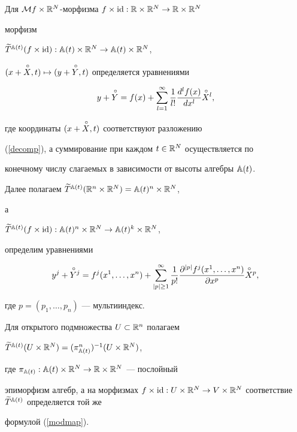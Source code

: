 Для ${\cal M} f\times{\Bbb R}^N$-морфизма $f\times\operatorname{id}:{\Bbb R}\times{\Bbb R}^N\rightarrow{\Bbb R}\times{\Bbb R}^N$


морфизм


$\widetilde T{}^{{\Bbb A}(t)}(f\times\operatorname{id}):{\Bbb A}(t)\times{\Bbb R}^N\rightarrow{\Bbb A}(t)\times{\Bbb R}^N$,


$(x+\overset{\,\circ}{X}{},t)\mapsto(y+\overset{\,\circ}{Y}{},t)$ определяется уравнениями


$$


y+\rad{Y}=f(x)+\sum^\infty_{l=1}\frac{1}{l!}


\frac{d^lf(x)}{dx^l}\rad{X}^l,


$$


где координаты $(x+\overset{\,\circ}{X}{},t)$ соответствуют разложению


(\ref{decomp}), а суммирование при каждом $t\in{\Bbb R}^N$ осуществляется по


конечному числу слагаемых в зависимости от высоты алгебры ${\Bbb A}(t)$.





Далее полагаем $\widetilde T{}^{{\Bbb A}(t)}({\Bbb R}^n\times{\Bbb R}^N)={\Bbb A}(t)^n\times{\Bbb R}^N$,


а


$\widetilde T{}^{{\Bbb A}(t)}(f\times\operatorname{id}):{\Bbb A}(t)^n\times{\Bbb R}^N\rightarrow{\Bbb A}(t)^k\times{\Bbb R}^N$,


определим уравнениями


\begin{equation}\label{modmap}


y^j+\rad{Y}^j=f^j(x^1,\dotsc,x^n)+


\sum^\infty_{|p|\geq 1}\frac{1}{p!}


\frac{\partial^{|p|}f^j(x^1,\dotsc,x^n)}{\partial x^p}\rad{X}^p,


\end{equation}


где $p=(p_1,\dotsc,p_n)$ --- мультииндекс.





Для открытого подмножества $U\subset{\Bbb R}^n$ полагаем


$\widetilde T{}^{{\Bbb A}(t)}(U\times{\Bbb R}^N)=(\pi^n_{{\Bbb A}(t)})^{-1}(U\times{\Bbb R}^N)$,


где $\pi_{{\Bbb A}(t)}:{\Bbb A}(t)\times{\Bbb R}^N\rightarrow{\Bbb R}\times{\Bbb R}^N$ --- послойный


эпиморфизм алгебр, а на морфизмах $f\times\id:U\times\R^N\to


V\times\R^N$ соответствие $\widetilde T{}^{\A(t)}$ определяется той же


формулой (\ref{modmap}).





